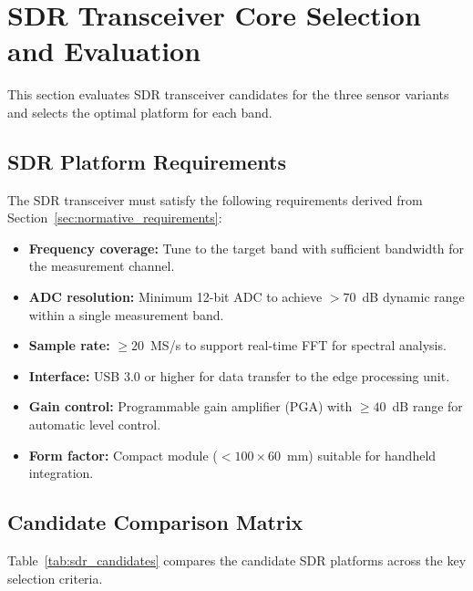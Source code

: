 \documentclass[11pt,a4paper]{article}
\begin{document}
\section{SDR Transceiver Core Selection and Evaluation}
\label{sec:sdr_selection}

This section evaluates SDR transceiver candidates for the three sensor variants and selects the optimal platform for each band.

\subsection{SDR Platform Requirements}

The SDR transceiver must satisfy the following requirements derived from Section~\ref{sec:normative_requirements}:

\begin{itemize}
    \item \textbf{Frequency coverage:} Tune to the target band with sufficient bandwidth for the measurement channel.
    \item \textbf{ADC resolution:} Minimum 12-bit ADC to achieve $> 70$~dB dynamic range within a single measurement band.
    \item \textbf{Sample rate:} $\geq 20$~MS/s to support real-time FFT for spectral analysis.
    \item \textbf{Interface:} USB 3.0 or higher for data transfer to the edge processing unit.
    \item \textbf{Gain control:} Programmable gain amplifier (PGA) with $\geq 40$~dB range for automatic level control.
    \item \textbf{Form factor:} Compact module ($< 100 \times 60$~mm) suitable for handheld integration.
\end{itemize}

\subsection{Candidate Comparison Matrix}

Table~\ref{tab:sdr_candidates} compares the candidate SDR platforms across the key selection criteria.
\end{document}

